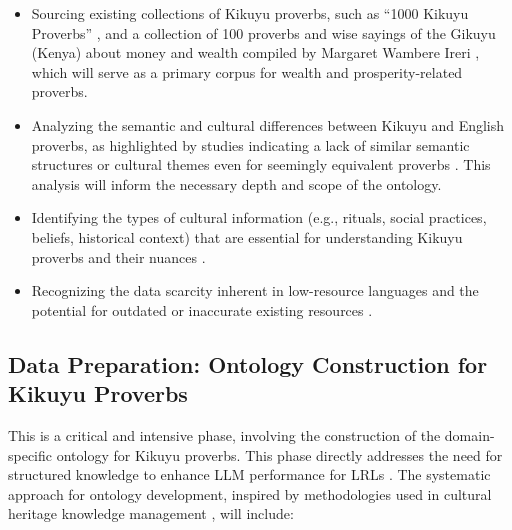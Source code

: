 \documentclass[12pt]{article}
\let\cite\textcite  %
\begin{document}
\begin{itemize}
\item Sourcing existing collections of Kikuyu proverbs, such as ``1000 Kikuyu Proverbs'' \cite{gikandi2023kikuyu, kenyatta2023mount}, and a collection of 100 proverbs and wise sayings of the Gikuyu (Kenya) about money and wealth compiled by Margaret Wambere Ireri \cite{ireri2024gikuyu}, which will serve as a primary corpus for wealth and prosperity-related proverbs.
\item Analyzing the semantic and cultural differences between Kikuyu and English proverbs, as highlighted by studies indicating a lack of similar semantic structures or cultural themes even for seemingly equivalent proverbs \cite{smith2023cultural}. This analysis will inform the necessary depth and scope of the ontology.
\item Identifying the types of cultural information (e.g., rituals, social practices, beliefs, historical context) that are essential for understanding Kikuyu proverbs and their nuances \cite{smith2023cultural}.
\item Recognizing the data scarcity inherent in low-resource languages and the potential for outdated or inaccurate existing resources \cite{datacamp2024kg}.
\end{itemize}

\subsection{Data Preparation: Ontology Construction for Kikuyu Proverbs}

This is a critical and intensive phase, involving the construction of the domain-specific ontology for Kikuyu proverbs. This phase directly addresses the need for structured knowledge to enhance LLM performance for LRLs \cite{datacamp2024kg}. The systematic approach for ontology development, inspired by methodologies used in cultural heritage knowledge management \cite{w3c2023owl}, will include:
\end{document}

